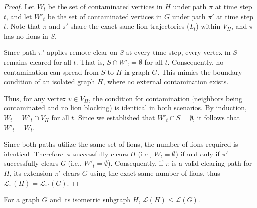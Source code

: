 \documentclass[a4paper,UKenglish,cleveref, autoref, thm-restate]{lipics-v2021}
\begin{document}
\begin{proof}
Let $W_t$ be the set of contaminated vertices in $H$ under path $\pi$ at time step $t$, and let $W'_t$ be the set of contaminated vertices in $G$ under path $\pi'$ at time step $t$. Note that $\pi$ and $\pi'$ share the exact same lion trajectories ($L_t$) within $V_H$, and $\pi$ has no lions in $S$.

Since path $\pi'$ applies remote clear on $S$ at every time step, every vertex in $S$ remains cleared for all $t$. That is, $S \cap W'_t = \emptyset$ for all $t$. Consequently, no contamination can spread from $S$ to $H$ in graph $G$. This mimics the boundary condition of an isolated graph $H$, where no external contamination exists.

Thus, for any vertex $v \in V_H$, the condition for contamination (neighbors being contaminated and no lion blocking) is identical in both scenarios. By induction, $W_t = W'_t \cap V_H$ for all $t$. Since we established that $W'_t \cap S = \emptyset$, it follows that $W'_t = W_t$.

Since both paths utilize the same set of lions, the number of lions required is identical. Therefore, $\pi$ successfully clears $H$ (i.e., $W_t = \emptyset$) if and only if $\pi'$ successfully clears $G$ (i.e., $W'_t = \emptyset$). Consequently, if $\pi$ is a valid clearing path for $H$, its extension $\pi'$ clears $G$ using the exact same number of lions, thus $\mathcal{L}_\pi(H)=\mathcal{L}_{\pi'}(G)$.
\end{proof}

\begin{theorem}\label{theorem:isometric_subgraph_theorem}
For a graph $G$ and its isometric subgraph $H$, $\mathcal{L}(H) \leq \mathcal{L}(G)$.
\end{theorem}
\end{document}
